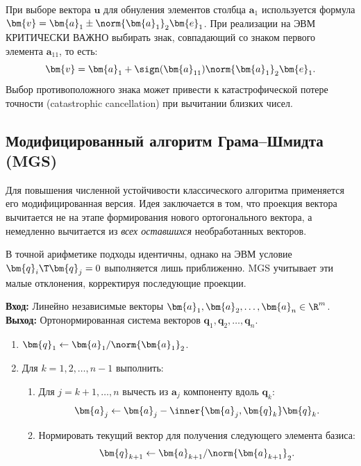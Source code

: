 \begin{tcbwarning}
\label{warn:householder-sign}
    При выборе вектора $\bm{u}$ для обнуления элементов столбца $\bm{a}_1$ используется формула $\bm{v} = \bm{a}_1 \pm \norm{\bm{a}_1}_2 \bm{e}_1$.
    При реализации на ЭВМ КРИТИЧЕСКИ ВАЖНО выбирать знак, совпадающий со знаком первого элемента $\bm{a}_{11}$, то есть:
    \[
        \bm{v} = \bm{a}_1 + \sign(\bm{a}_{11}) \norm{\bm{a}_1}_2 \bm{e}_1.
    \]
    Выбор противоположного знака может привести к катастрофической потере точности (catastrophic cancellation) при вычитании близких чисел.
\end{tcbwarning}

\vspace{5mm}
\subsection{Модифицированный алгоритм Грама--Шмидта (MGS)}
\label{subsec:mgs}

Для повышения численной устойчивости классического алгоритма применяется его модифицированная версия. Идея заключается в том, что проекция вектора вычитается не на этапе формирования нового ортогонального вектора, а немедленно вычитается из \textit{всех оставшихся} необработанных векторов.

В точной арифметике подходы идентичны, однако на ЭВМ условие $\bm{q}_i\T \bm{q}_j = 0$ выполняется лишь приближенно. MGS учитывает эти малые отклонения, корректируя последующие проекции.

\begin{tcbalgorithmbox}
\label{alg:mgs}
    \textbf{Вход:} Линейно независимые векторы $\bm{a}_1, \bm{a}_2, \ldots, \bm{a}_n \in \R^m$.\\
    \textbf{Выход:} Ортонормированная система векторов $\bm{q}_1, \bm{q}_2, \ldots, \bm{q}_n$.
    \begin{enumerate}
        \item $\bm{q}_1 \gets \bm{a}_1 / \norm{\bm{a}_1}_2$.
        \item Для $k = 1, 2, \ldots, n-1$ выполнить:
        \begin{enumerate}
            \item Для $j = k+1, \ldots, n$ вычесть из $\bm{a}_j$ компоненту вдоль $\bm{q}_k$:
            \[
                \bm{a}_j \gets \bm{a}_j - \inner{\bm{a}_j, \bm{q}_k}\bm{q}_k.
            \]
            \item Нормировать текущий вектор для получения следующего элемента базиса:
            \[
                \bm{q}_{k+1} \gets \bm{a}_{k+1} / \norm{\bm{a}_{k+1}}_2.
            \]
        \end{enumerate}
    \end{enumerate}
\end{tcbalgorithmbox}


